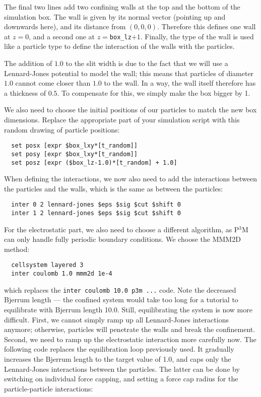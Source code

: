 \documentclass[
a4paper,                        %
11pt,                           %
twoside,                        %
footsepline,                    %
headsepline,                    %
headexclude,                    %
footexclude,                    %
pagesize,                       %
]{scrartcl}
\begin{document}
The final two lines add two confining walls at the top
and the bottom of the simulation box. The wall is given by its normal
vector (pointing up and downwards here), and its distance from
$(0,0,0)$. Therefore this defines one wall at $z=0$, and a second
one at $z=$\verb|box_lz|$+1$. Finally, the type of the wall is used like a
particle type to define the interaction of the walls with the particles.

The addition of $1.0$ to the slit width is due to the fact that we will
use a Lennard-Jones potential to model the wall; this means that
particles of diameter $1.0$ cannot come closer than $1.0$ to the wall. In a
way, the wall itself therefore has a thickness of $0.5$. To compensate
for this, we simply make the box bigger by 1.

We also need to choose the initial positions of our particles to match
the new box dimensions. Replace the appropriate part of your
simulation script with this random drawing of particle positions:

\begin{lstlisting}
  set posx [expr $box_lxy*[t_random]]
  set posy [expr $box_lxy*[t_random]]
  set posz [expr ($box_lz-1.0)*[t_random] + 1.0]
\end{lstlisting}

When defining the interactions, we now also need to add the
interactions between the particles and the walls, which is the same as
between the particles:

\begin{lstlisting}
  inter 0 2 lennard-jones $eps $sig $cut $shift 0
  inter 1 2 lennard-jones $eps $sig $cut $shift 0
\end{lstlisting}

For the electrostatic part, we also need to choose a different algorithm,
as P$^3$M can only handle fully periodic boundary conditions. We
choose the MMM2D method:

\begin{lstlisting}
  cellsystem layered 3
  inter coulomb 1.0 mmm2d 1e-4  
\end{lstlisting}

which replaces the \verb|inter coulomb 10.0 p3m ...| code. Note the
decreased Bjerrum length --- the confined system would take too long for
a tutorial to equilibrate with Bjerrum length 10.0. Still,
equilibrating the system is now more difficult. First, we cannot
simply ramp up all Lennard-Jones interactions anymore; otherwise,
particles will penetrate the walls and break the confinement. Second,
we need to ramp up the electrostatic interaction more carefully
now. The following code replaces the equilibration loop previously 
used. It gradually increases the Bjerrum length to the
target value of 1.0, and caps only the Lennard-Jones interactions
between the particles. The latter can be done by switching on
individual force capping, and setting a force cap radius for the
particle-particle interactions:
\end{document}
